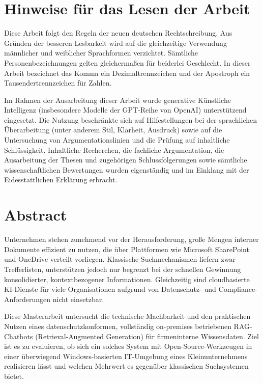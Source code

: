 \section*{Hinweise für das Lesen der Arbeit}

Diese Arbeit folgt den Regeln der neuen deutschen Rechtschreibung. Aus Gründen der besseren Lesbarkeit wird auf die gleichzeitige Verwendung männlicher und weiblicher Sprachformen verzichtet. Sämtliche Personenbezeichnungen gelten gleichermaßen für beiderlei Geschlecht. In dieser Arbeit bezeichnet das Komma ein Dezimaltrennzeichen und der Apostroph ein Tausendertrennzeichen für Zahlen.

Im Rahmen der Ausarbeitung dieser Arbeit wurde generative Künstliche Intelligenz (insbesondere Modelle der GPT-Reihe von OpenAI) unterstützend eingesetzt. Die Nutzung beschränkte sich auf Hilfestellungen bei der sprachlichen Überarbeitung (unter anderem Stil, Klarheit, Ausdruck) sowie auf die Untersuchung von Argumentationslinien und die Prüfung auf inhaltliche Schlüssigkeit. Inhaltliche Recherchen, die fachliche Argumentation, die Ausarbeitung der Thesen und zugehörigen Schlussfolgerungen sowie sämtliche wissenschaftlichen Bewertungen wurden eigenständig und im Einklang mit der Eidesstattlichen Erklärung erbracht.

\newpage
\section*{Abstract}

Unternehmen stehen zunehmend vor der Herausforderung, große Mengen interner Dokumente effizient zu nutzen, die über Plattformen wie Microsoft SharePoint und OneDrive verteilt vorliegen. Klassische Suchmechanismen liefern zwar Trefferlisten, unterstützen jedoch nur begrenzt bei der schnellen Gewinnung konsolidierter, kontextbezogener Informationen. Gleichzeitig sind cloudbasierte KI-Dienste für viele Organisationen aufgrund von Datenschutz- und Compliance-Anforderungen nicht einsetzbar.


Diese Masterarbeit untersucht die technische Machbarkeit und den praktischen Nutzen eines datenschutzkonformen, vollständig on-premises betriebenen RAG-Chatbots (Retrieval-Augmented Generation) für firmeninterne Wissensdaten. Ziel ist es zu evaluieren, ob sich ein solches System mit Open-Source-Werkzeugen in einer überwiegend Windows-basierten IT-Umgebung eines Kleinunternehmens realisieren lässt und welchen Mehrwert es gegenüber klassischen Suchsystemen bietet.


